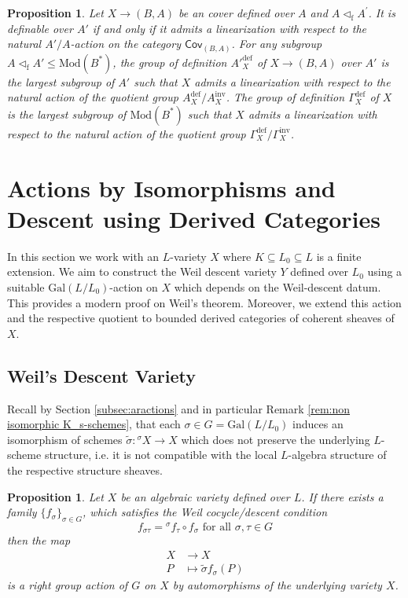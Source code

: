 \documentclass[10pt]{amsart}
\newtheorem{proposition}[theorem]{Proposition}
\theoremstyle{definition}
\newcommand{\Gal}{{ \mathrm{Gal}}}
\begin{document}
\begin{proposition}\label{prop:equivariantweildescent-top}
Let $X \to (B,A)$ be an cover defined over $A$ and $A \lhd_{\mathrm{f}} A^{\prime}$. It is definable over $A'$ if and only if it admits a linearization with respect to the natural $A'/A$-action on the category $\mathsf{Cov}_{(B,A)}$. 
For any subgroup $A \lhd_{\mathrm{f}} A' \leq \mathrm{Mod}(B^*)$, the group of definition ${A'}_X^{\mathrm{def}}$ of $X \to (B,A)$ over $A'$ is the largest subgroup of $A'$ such that $X$ admits a linearization with respect to the natural action of the quotient group $A_X^{\mathrm{def}}/A_X^{\mathrm{inv}}$. 
The group of definition $\mathfrak{\Gamma}^{\mathrm{def}}_X$ of $X$ is the largest subgroup of $\mathrm{Mod}(B^*)$ such that $X$ admits a linearization with respect to the natural action of the quotient group $\mathfrak{\Gamma}_X^{\mathrm{def}} / \mathfrak{\Gamma}_X^{\mathrm{inv}}$.
\end{proposition}







\section{Actions by Isomorphisms and Descent using Derived Categories}\label{sec: descent using derived categories}

In this section we work with an $L$-variety $X$ where $K \subseteq L_0 \subseteq L$ is a finite extension. We aim to construct the Weil descent variety $Y$ defined over $L_0$ using a suitable $\Gal(L /L_0)$-action on $X$ which depends on the Weil-descent datum. This provides a modern proof on Weil's theorem. Moreover, we extend this action and the respective quotient to bounded derived categories of coherent sheaves of $X$.

\subsection{Weil's Descent Variety}
Recall by Section \ref{subsec:aractions} and in particular Remark \ref{rem:non isomorphic K_s-schemes}, that each $\sigma \in G = \Gal(L/L_0)$ induces an isomorphism of schemes 
$\tilde{\sigma} \colon {^\sigma \! X} \rightarrow X$ which does not preserve the underlying $L$-scheme structure, i.e. it is not compatible with the local $L$-algebra structure of the respective structure sheaves.

\begin{proposition}\label{prop: group action by weil descent}
Let $X$ be an algebraic variety defined over $L$. If there exists a family $\{f_\sigma\}_{\sigma \in G} $, 
which  satisfies the Weil cocycle/descent condition 
\[
  f_{\sigma\tau}={^\sigma \! f_{\tau} \circ f_\sigma} \text{ for all } \sigma,\tau \in G
\]
then the map
\begin{align*}
X & \longrightarrow X  
\\
P & \longmapsto \tilde{\sigma} f_\sigma(P)
\end{align*}
is a right group action of $G$ on $X$ by automorphisms of the underlying variety $X$.
\end{proposition}
\end{document}
